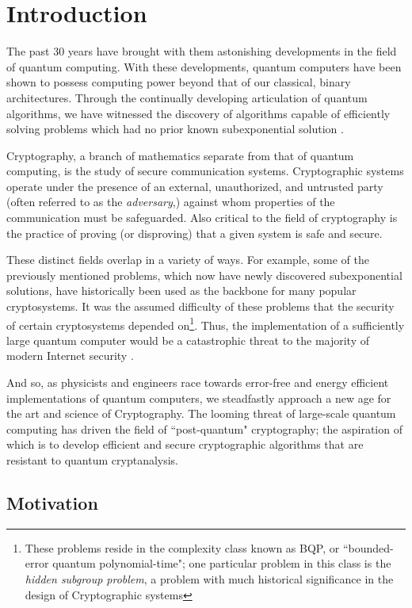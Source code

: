 \chapter{Introduction}

The past 30 years have brought with them astonishing developments in the field of quantum computing. With these developments, quantum computers have been shown to possess computing power beyond that of our classical, binary architectures. Through the continually developing articulation of quantum algorithms, we have witnessed the discovery of algorithms capable of efficiently solving problems which had no prior known subexponential solution \cite{qcintro}.

Cryptography, a branch of mathematics separate from that of quantum computing, is the study of secure communication systems. Cryptographic systems operate under the presence of an external, unauthorized, and untrusted party (often referred to as the \textit{adversary},) against whom properties of the communication must be safeguarded. Also critical to the field of cryptography is the practice of proving (or disproving) that a given system is safe and secure.

These distinct fields overlap in a variety of ways. For example, some of the previously mentioned problems, which now have newly discovered subexponential solutions, have historically been used as the backbone for many popular cryptosystems. It was the assumed difficulty of these problems that the security of certain cryptosystems depended on\footnote{These problems reside in the complexity class known as BQP, or ``bounded-error quantum polynomial-time"; one particular problem in this class is the \textit{hidden subgroup problem}, a problem with much historical significance in the design of Cryptographic systems}. Thus, the implementation of a sufficiently large quantum computer would be a catastrophic threat to the majority of modern Internet security \cite{shor}.

And so, as physicists and engineers race towards error-free and energy efficient implementations of quantum computers, we steadfastly approach a new age for the art and science of Cryptography. The looming threat of large-scale quantum computing has driven the field of ``post-quantum" cryptography; the aspiration of which is to develop efficient and secure cryptographic algorithms that are resistant to quantum cryptanalysis.\\

\section{Motivation}
\label{sec:motivation}

